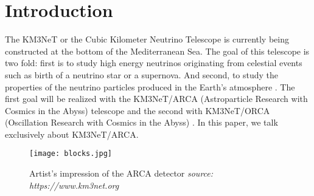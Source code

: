 

\chapter{Introduction}





The KM3NeT or the Cubic Kilometer Neutrino Telescope is currently being
constructed at the bottom of the Mediterranean Sea. The goal of this telescope
is two fold: first is to study high energy neutrinos originating from celestial
events such as birth of a neutrino star or a supernova. And second, to study
the properties of the neutrino particles produced in the Earth's atmosphere
\cite{adrian2016letter}. The first goal will be realized with the KM3NeT/ARCA
(Astroparticle Research with Cosmics in the Abyss) telescope and the second
with KM3NeT/ORCA (Oscillation Research with Cosmics in the Abyss)
\cite{adrian2016letter}. In this paper, we talk exclusively about KM3NeT/ARCA.

\begin{figure}[h]
  \centering
  \texttt{[image: blocks.jpg]}
  \caption{Artist's impression of the ARCA detector \textit{source: https://www.km3net.org}}%
  \label{fig:blocks}
\end{figure}

